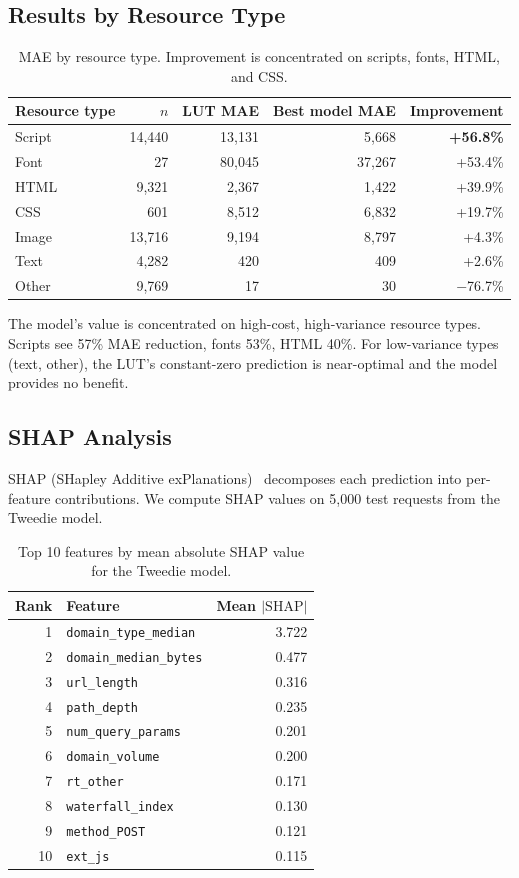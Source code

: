 \documentclass[11pt]{article}
\begin{document}
\subsection{Results by Resource Type}

\begin{table}[h]
\centering
\small
\begin{tabular}{lrrrr}
\toprule
Resource type & $n$ & LUT MAE & Best model MAE & Improvement \\
\midrule
Script & 14,440 & 13,131 & 5,668 & \textbf{+56.8\%} \\
Font & 27 & 80,045 & 37,267 & +53.4\% \\
HTML & 9,321 & 2,367 & 1,422 & +39.9\% \\
CSS & 601 & 8,512 & 6,832 & +19.7\% \\
Image & 13,716 & 9,194 & 8,797 & +4.3\% \\
Text & 4,282 & 420 & 409 & +2.6\% \\
Other & 9,769 & 17 & 30 & $-$76.7\% \\
\bottomrule
\end{tabular}
\caption{MAE by resource type. Improvement is concentrated on scripts, fonts, HTML, and CSS.}
\label{tab:by-type}
\end{table}

The model's value is concentrated on high-cost, high-variance resource types. Scripts see 57\% MAE reduction, fonts 53\%, HTML 40\%. For low-variance types (text, other), the LUT's constant-zero prediction is near-optimal and the model provides no benefit.

\subsection{SHAP Analysis}

SHAP (SHapley Additive exPlanations)~\citep{lundberg2017shap} decomposes each prediction into per-feature contributions. We compute SHAP values on 5,000 test requests from the Tweedie model.

\begin{table}[h]
\centering
\small
\begin{tabular}{rlr}
\toprule
Rank & Feature & Mean $|\text{SHAP}|$ \\
\midrule
1 & \texttt{domain\_type\_median} & 3.722 \\
2 & \texttt{domain\_median\_bytes} & 0.477 \\
3 & \texttt{url\_length} & 0.316 \\
4 & \texttt{path\_depth} & 0.235 \\
5 & \texttt{num\_query\_params} & 0.201 \\
6 & \texttt{domain\_volume} & 0.200 \\
7 & \texttt{rt\_other} & 0.171 \\
8 & \texttt{waterfall\_index} & 0.130 \\
9 & \texttt{method\_POST} & 0.121 \\
10 & \texttt{ext\_js} & 0.115 \\
\bottomrule
\end{tabular}
\caption{Top 10 features by mean absolute SHAP value for the Tweedie model.}
\label{tab:shap}
\end{table}
\end{document}
